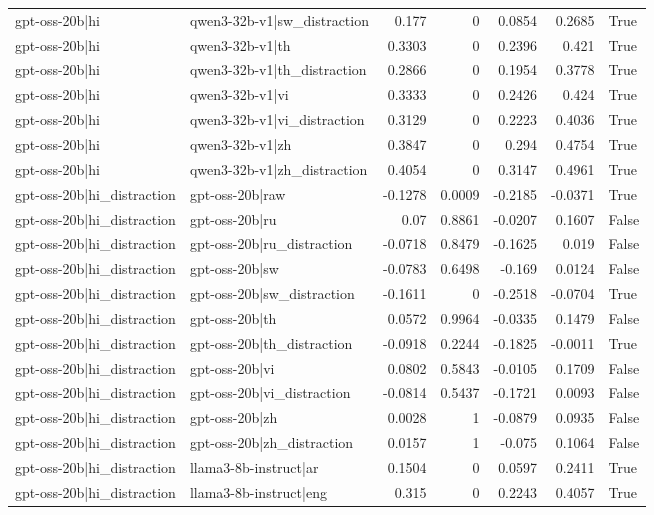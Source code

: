 \begin{table}
\begin{tabular}{l l r r r r l}
gpt-oss-20b|hi & qwen3-32b-v1|sw_distraction & 0.177 & 0 & 0.0854 & 0.2685 & True \\
gpt-oss-20b|hi & qwen3-32b-v1|th & 0.3303 & 0 & 0.2396 & 0.421 & True \\
gpt-oss-20b|hi & qwen3-32b-v1|th_distraction & 0.2866 & 0 & 0.1954 & 0.3778 & True \\
gpt-oss-20b|hi & qwen3-32b-v1|vi & 0.3333 & 0 & 0.2426 & 0.424 & True \\
gpt-oss-20b|hi & qwen3-32b-v1|vi_distraction & 0.3129 & 0 & 0.2223 & 0.4036 & True \\
gpt-oss-20b|hi & qwen3-32b-v1|zh & 0.3847 & 0 & 0.294 & 0.4754 & True \\
gpt-oss-20b|hi & qwen3-32b-v1|zh_distraction & 0.4054 & 0 & 0.3147 & 0.4961 & True \\
gpt-oss-20b|hi_distraction & gpt-oss-20b|raw & -0.1278 & 0.0009 & -0.2185 & -0.0371 & True \\
gpt-oss-20b|hi_distraction & gpt-oss-20b|ru & 0.07 & 0.8861 & -0.0207 & 0.1607 & False \\
gpt-oss-20b|hi_distraction & gpt-oss-20b|ru_distraction & -0.0718 & 0.8479 & -0.1625 & 0.019 & False \\
gpt-oss-20b|hi_distraction & gpt-oss-20b|sw & -0.0783 & 0.6498 & -0.169 & 0.0124 & False \\
gpt-oss-20b|hi_distraction & gpt-oss-20b|sw_distraction & -0.1611 & 0 & -0.2518 & -0.0704 & True \\
gpt-oss-20b|hi_distraction & gpt-oss-20b|th & 0.0572 & 0.9964 & -0.0335 & 0.1479 & False \\
gpt-oss-20b|hi_distraction & gpt-oss-20b|th_distraction & -0.0918 & 0.2244 & -0.1825 & -0.0011 & True \\
gpt-oss-20b|hi_distraction & gpt-oss-20b|vi & 0.0802 & 0.5843 & -0.0105 & 0.1709 & False \\
gpt-oss-20b|hi_distraction & gpt-oss-20b|vi_distraction & -0.0814 & 0.5437 & -0.1721 & 0.0093 & False \\
gpt-oss-20b|hi_distraction & gpt-oss-20b|zh & 0.0028 & 1 & -0.0879 & 0.0935 & False \\
gpt-oss-20b|hi_distraction & gpt-oss-20b|zh_distraction & 0.0157 & 1 & -0.075 & 0.1064 & False \\
gpt-oss-20b|hi_distraction & llama3-8b-instruct|ar & 0.1504 & 0 & 0.0597 & 0.2411 & True \\
gpt-oss-20b|hi_distraction & llama3-8b-instruct|eng & 0.315 & 0 & 0.2243 & 0.4057 & True \\

\end{tabular}
\end{table}
